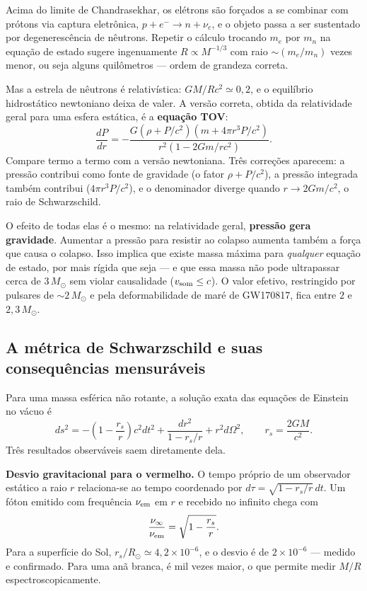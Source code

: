 \documentclass[11pt,a4paper]{article}
\begin{document}
Acima do limite de Chandrasekhar, os elétrons são forçados a se combinar com prótons via captura eletrônica, $p+e^{-}\to n+\nu_e$, e o objeto passa a ser sustentado por degenerescência de nêutrons. Repetir o cálculo trocando $m_e$ por $m_n$ na equação de estado sugere ingenuamente $R\propto M^{-1/3}$ com raio $\sim(m_e/m_n)$ vezes menor, ou seja alguns quilômetros --- ordem de grandeza correta.

Mas a estrela de nêutrons é relativística: $GM/Rc^{2}\simeq0{,}2$, e o equilíbrio hidrostático newtoniano deixa de valer. A versão correta, obtida da relatividade geral para uma esfera estática, é a \textbf{equação TOV}:
\[
\frac{dP}{dr}=-\frac{G(\rho+P/c^{2})\left(m+4\pi r^{3}P/c^{2}\right)}{r^{2}\left(1-2Gm/rc^{2}\right)}.
\]
Compare termo a termo com a versão newtoniana. Três correções aparecem: a pressão contribui como fonte de gravidade (o fator $\rho+P/c^{2}$), a pressão integrada também contribui ($4\pi r^{3}P/c^{2}$), e o denominador diverge quando $r\to2Gm/c^{2}$, o raio de Schwarzschild.

O efeito de todas elas é o mesmo: na relatividade geral, \textbf{pressão gera gravidade}. Aumentar a pressão para resistir ao colapso aumenta também a força que causa o colapso. Isso implica que existe massa máxima para \emph{qualquer} equação de estado, por mais rígida que seja --- e que essa massa não pode ultrapassar cerca de $3\,M_\odot$ sem violar causalidade ($v_{\rm som}\le c$). O valor efetivo, restringido por pulsares de $\sim2\,M_\odot$ e pela deformabilidade de maré de GW170817, fica entre $2$ e $2{,}3\,M_\odot$.

\subsection*{A métrica de Schwarzschild e suas consequências mensuráveis}

Para uma massa esférica não rotante, a solução exata das equações de Einstein no vácuo é
\[
ds^{2}=-\left(1-\frac{r_s}{r}\right)c^{2}dt^{2}+\frac{dr^{2}}{1-r_s/r}+r^{2}d\Omega^{2},
\qquad r_s=\frac{2GM}{c^{2}}.
\]
Três resultados observáveis saem diretamente dela.

\textbf{Desvio gravitacional para o vermelho.} O tempo próprio de um observador estático a raio $r$ relaciona-se ao tempo coordenado por $d\tau=\sqrt{1-r_s/r}\,dt$. Um fóton emitido com frequência $\nu_{\rm em}$ em $r$ e recebido no infinito chega com
\[
\frac{\nu_\infty}{\nu_{\rm em}}=\sqrt{1-\frac{r_s}{r}}.
\]
Para a superfície do Sol, $r_s/R_\odot\simeq4{,}2\times10^{-6}$, e o desvio é de $2\times10^{-6}$ --- medido e confirmado. Para uma anã branca, é mil vezes maior, o que permite medir $M/R$ espectroscopicamente.
\end{document}
